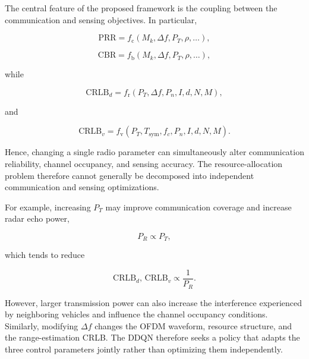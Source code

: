 The central feature of the proposed framework is the coupling between the
communication and sensing objectives. In particular,

\begin{equation}
\mathrm{PRR}
=
f_{\mathrm{c}}
\left(
M_k,\Delta f,P_T,\rho,\ldots
\right),
\label{eq:isac_prr_dependency}
\end{equation}

\begin{equation}
\mathrm{CBR}
=
f_{\mathrm{b}}
\left(
M_k,\Delta f,P_T,\rho,\ldots
\right),
\label{eq:isac_cbr_dependency}
\end{equation}

while

\begin{equation}
\mathrm{CRLB}_{d}
=
f_{\mathrm{r}}
\left(
P_T,\Delta f,
P_n,I,d,N,M
\right),
\label{eq:isac_range_dependency}
\end{equation}

and

\begin{equation}
\mathrm{CRLB}_{v}
=
f_{\mathrm{v}}
\left(
P_T,
T_{\mathrm{sym}},
f_c,
P_n,
I,
d,
N,
M
\right).
\label{eq:isac_velocity_dependency}
\end{equation}

Hence, changing a single radio parameter can simultaneously alter
communication reliability, channel occupancy, and sensing accuracy. The
resource-allocation problem therefore cannot generally be decomposed into
independent communication and sensing optimizations.

For example, increasing $P_T$ may improve communication coverage and
increase radar echo power,

\begin{equation}
P_R
\propto
P_T,
\label{eq:isac_power_echo_relation}
\end{equation}

which tends to reduce

\begin{equation}
\mathrm{CRLB}_{d},
\,
\mathrm{CRLB}_{v}
\propto
\frac{1}{P_R}.
\label{eq:isac_crlb_power_relation}
\end{equation}

However, larger transmission power can also increase the interference
experienced by neighboring vehicles and influence the channel occupancy
conditions. Similarly, modifying $\Delta f$ changes the OFDM waveform,
resource structure, and the range-estimation CRLB. The DDQN therefore seeks
a policy that adapts the three control parameters jointly rather than
optimizing them independently.


